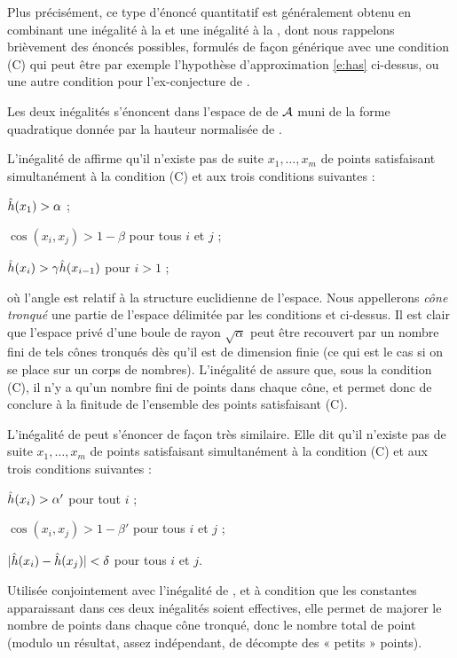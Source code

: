 \medskip

Plus précisément, ce type d'énoncé quantitatif est généralement obtenu en
combinant une inégalité à la  et une inégalité à la ,
dont nous rappelons brièvement des énoncés possibles, formulés de façon
générique avec une condition (C) qui peut être par exemple l'hypothèse
d'approximation \eqref{e:has} ci-dessus, ou une autre condition pour
l'ex-conjecture de .

Les deux inégalités s'énoncent dans l'espace de  de \( \mathcal A \)
muni de la forme quadratique donnée par la hauteur normalisée de
.

L'inégalité de  affirme qu'il n'existe pas de suite \( x_1, \dots,
  x_m \) de points satisfaisant simultanément à la condition (C) et aux trois
conditions suivantes :
\begin{enumthm}
  \item \( \hat h (x_1) > \alpha \) ; \label{i:grand}
  \item \( \cos(x_i, x_j) > 1 - \beta \) pour tous \( i \) et \( j \) ;
    \label{i:proche}
  \item \( \hat h (x_i) > \gamma \hat h (x_{i-1}) \) pour \( i > 1 \) ;
\end{enumthm}
où l'angle est relatif à la structure euclidienne de l'espace. Nous
appellerons \emph{cône tronqué} une partie de l'espace délimitée par les
conditions  et  ci-dessus. Il est clair que
l'espace privé d'une boule de rayon \( \sqrt{\alpha} \) peut être recouvert
par un nombre fini de tels cônes tronqués dès qu'il est de dimension finie (ce
qui est le cas si on se place sur un corps de nombres). L'inégalité de
 assure que, sous la condition (C), il n'y a qu'un nombre fini de
points dans chaque cône, et permet donc de conclure à la finitude de
l'ensemble des points satisfaisant (C).

L'inégalité de  peut s'énoncer de façon très similaire. Elle dit
qu'il n'existe pas de suite \( x_1, \dots, x_m \) de points satisfaisant
simultanément à la condition (C) et aux trois conditions suivantes :
\begin{enumthm}
  \item \( \hat h (x_i) > \alpha' \) pour tout \( i \) ;
  \item \( \cos(x_i, x_j) > 1 - \beta' \) pour tous \( i \) et \( j \) ;
  \item \( \lvert \hat h (x_i) - \hat h (x_j) \rvert < \delta \) pour tous \( i \) et
    \( j \).
\end{enumthm}
Utilisée conjointement avec l'inégalité de , et à condition que les
constantes apparaissant dans ces deux inégalités soient effectives, elle
permet de majorer le nombre de points dans chaque cône tronqué, donc le nombre
total de point (modulo un résultat, assez indépendant, de décompte des «
petits » points).

